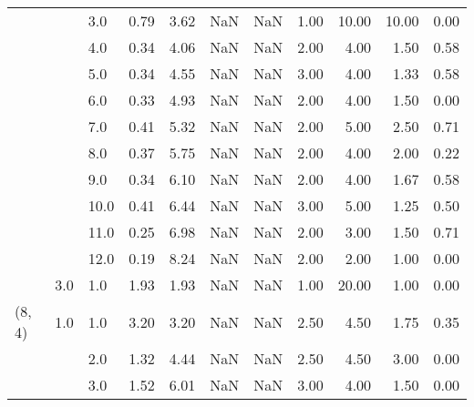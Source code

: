\begin{tabular}{lllrrrrrrrr}
       &     & 3.0  &      0.79 &       3.62 &               NaN &                NaN & 1.00 &  10.00 &            10.00 &                         0.00 \\
       &     & 4.0  &      0.34 &       4.06 &               NaN &                NaN & 2.00 &   4.00 &             1.50 &                         0.58 \\
       &     & 5.0  &      0.34 &       4.55 &               NaN &                NaN & 3.00 &   4.00 &             1.33 &                         0.58 \\
       &     & 6.0  &      0.33 &       4.93 &               NaN &                NaN & 2.00 &   4.00 &             1.50 &                         0.00 \\
       &     & 7.0  &      0.41 &       5.32 &               NaN &                NaN & 2.00 &   5.00 &             2.50 &                         0.71 \\
       &     & 8.0  &      0.37 &       5.75 &               NaN &                NaN & 2.00 &   4.00 &             2.00 &                         0.22 \\
       &     & 9.0  &      0.34 &       6.10 &               NaN &                NaN & 2.00 &   4.00 &             1.67 &                         0.58 \\
       &     & 10.0 &      0.41 &       6.44 &               NaN &                NaN & 3.00 &   5.00 &             1.25 &                         0.50 \\
       &     & 11.0 &      0.25 &       6.98 &               NaN &                NaN & 2.00 &   3.00 &             1.50 &                         0.71 \\
       &     & 12.0 &      0.19 &       8.24 &               NaN &                NaN & 2.00 &   2.00 &             1.00 &                         0.00 \\
       & 3.0 & 1.0  &      1.93 &       1.93 &               NaN &                NaN & 1.00 &  20.00 &             1.00 &                         0.00 \\
(8, 4) & 1.0 & 1.0  &      3.20 &       3.20 &               NaN &                NaN & 2.50 &   4.50 &             1.75 &                         0.35 \\
       &     & 2.0  &      1.32 &       4.44 &               NaN &                NaN & 2.50 &   4.50 &             3.00 &                         0.00 \\
       &     & 3.0  &      1.52 &       6.01 &               NaN &                NaN & 3.00 &   4.00 &             1.50 &                         0.00 \\

\end{tabular}
